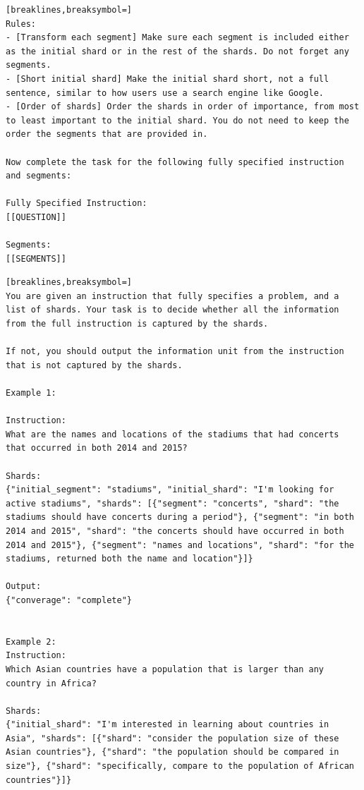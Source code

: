 \documentclass{article}
\begin{document}
\begin{appendices}
\begin{tcolorbox}[title=Rephrasing]
{\begin{Verbatim}[breaklines,breaksymbol=]
Rules:
- [Transform each segment] Make sure each segment is included either as the initial shard or in the rest of the shards. Do not forget any segments.
- [Short initial shard] Make the initial shard short, not a full sentence, similar to how users use a search engine like Google.
- [Order of shards] Order the shards in order of importance, from most to least important to the initial shard. You do not need to keep the order the segments that are provided in.

Now complete the task for the following fully specified instruction and segments:

Fully Specified Instruction:
[[QUESTION]]

Segments:
[[SEGMENTS]]

\end{Verbatim}
}
\end{tcolorbox}

\begin{tcolorbox}[title=Verification]
{\footnotesize
\begin{Verbatim}[breaklines,breaksymbol=]
You are given an instruction that fully specifies a problem, and a list of shards. Your task is to decide whether all the information from the full instruction is captured by the shards.

If not, you should output the information unit from the instruction that is not captured by the shards.

Example 1:

Instruction:
What are the names and locations of the stadiums that had concerts that occurred in both 2014 and 2015?

Shards:
{"initial_segment": "stadiums", "initial_shard": "I'm looking for active stadiums", "shards": [{"segment": "concerts", "shard": "the stadiums should have concerts during a period"}, {"segment": "in both 2014 and 2015", "shard": "the concerts should have occurred in both 2014 and 2015"}, {"segment": "names and locations", "shard": "for the stadiums, returned both the name and location"}]}

Output:
{"converage": "complete"}


Example 2:
Instruction:
Which Asian countries have a population that is larger than any country in Africa?

Shards:
{"initial_shard": "I'm interested in learning about countries in Asia", "shards": [{"shard": "consider the population size of these Asian countries"}, {"shard": "the population should be compared in size"}, {"shard": "specifically, compare to the population of African countries"}]}


\end{Verbatim}}
\end{tcolorbox}
\end{appendices}
\end{document}

